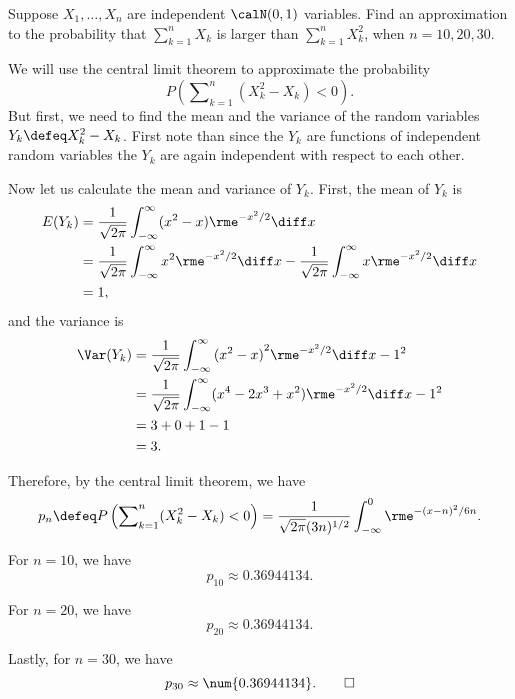 \begin{problem}[Handout 14, \# 7]
  Suppose \(X_1,\dotsc,X_n\) are independent \(\calN(0,1)\) variables. Find
  an approximation to the probability that \(\sum_{k=1}^n X_k\) is larger
  than \(\sum_{k=1}^n X_k^2\), when \(n=10,20,30\).
\end{problem}
\begin{solution}
  We will use the central limit theorem to approximate the probability
  \[
    P\left(\sum\nolimits_{k=1}^n (X_k^2-X_k)<0\right).
  \]
  But first, we need to find the mean and the variance of the random
  variables \(Y_k\defeq X_k^2-X_k\). First note than since the \(Y_k\) are
  functions of independent random variables the \(Y_k\) are again
  independent with respect to each other.

  Now let us calculate the mean and variance of \(Y_k\). First, the mean of
  \(Y_k\) is
  \begin{align*}
    E(Y_k)
    &=\frac{1}{\sqrt{2\pi}}\int_{-\infty}^\infty (x^2-x)\rme^{-x^2/2}\diff
      x\\
    &=\frac{1}{\sqrt{2\pi}}\int_{-\infty}^\infty x^2\rme^{-x^2/2}\diff
      x
      -\frac{1}{\sqrt{2\pi}}\int_{-\infty}^\infty x\rme^{-x^2/2}\diff
      x\\
    &=1,
  \end{align*}
  and the variance is
  \begin{align*}
    \Var(Y_k)
    &=\frac{1}{\sqrt{2\pi}}\int_{-\infty}^\infty {(x^2-x)}^2
      \rme^{-x^2/2}\diff x-1^2\\
    &=\frac{1}{\sqrt{2\pi}}\int_{-\infty}^\infty (x^4-2x^3+x^2)
      \rme^{-x^2/2}\diff x-1^2\\
    &=3+0+1-1\\
    &=3.
  \end{align*}

  Therefore, by the central limit theorem, we have
  \[
    p_n\defeq P\left(\sum\nolimits_{k=1}^n (X_k^2-X_k)<0\right)
    =\frac{1}{\sqrt{2\pi}(3n)^{1/2}}\int_{-\infty}^0\rme^{-(x-n)^2/6n}.
  \]

  For \(n=10\), we have
  \[
    p_{10}\approx\num{0.36944134}.
  \]

  For \(n=20\), we have
  \[
    p_{20}\approx\num{0.36944134}.
  \]

  Lastly, for \(n=30\), we have
  \[
    p_{30}\approx\num{0.36944134}.\qedhere
  \]
\end{solution}
\newpage

